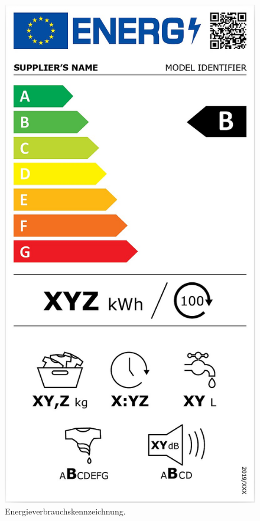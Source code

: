 \begin{figure}[htb]
\begin{minipage}{0.3\textwidth}
\includegraphics[scale=0.07]{eu_washing_machines_label}
\caption{Energieverbrauchskennzeichnung.}
\label{figure-energie}
\end{minipage}

\end{figure}
